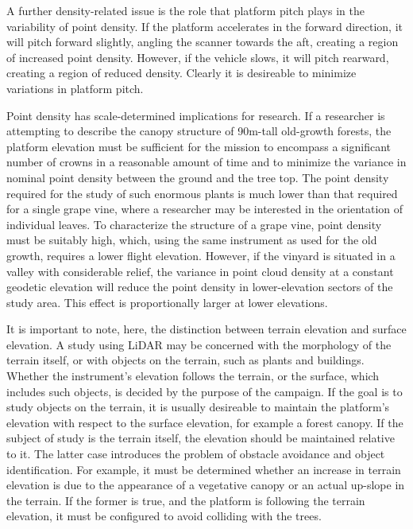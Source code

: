 \documentclass[10pt,a4paper]{report}
\begin{document}
A further density-related issue is the role that platform pitch plays in the variability of point density. If the platform accelerates in the forward direction, it will pitch forward slightly, angling the scanner towards the aft, creating a region of increased point density. However, if the vehicle slows, it will pitch rearward, creating a region of reduced density. Clearly it is desireable to minimize variations in platform pitch.

Point density has scale-determined implications for research. If a researcher is attempting to describe the canopy structure of 90m-tall old-growth forests, the platform elevation must be sufficient for the mission to encompass a significant number of crowns in a reasonable amount of time and to  minimize the variance in nominal point density between the ground and the tree top. The point density required for the study of such enormous plants is much lower than that required for a single grape vine, where a researcher may be interested in the orientation of individual leaves. To characterize the structure of a grape vine, point density must be suitably high, which, using the same instrument as used for the old growth, requires a lower flight elevation. However, if the vinyard is situated in a valley with considerable relief, the variance in point cloud density at a constant geodetic elevation will reduce the point density in lower-elevation sectors of the study area. This effect is proportionally larger at lower elevations.

It is important to note, here, the distinction between terrain elevation and surface elevation. A study using LiDAR may be concerned with the morphology of the terrain itself, or with objects on the terrain, such as plants and buildings. Whether the instrument's elevation follows the terrain, or the surface, which includes such objects, is decided by the purpose of the campaign. If the goal is to study objects on the terrain, it is usually desireable to maintain the platform's elevation with respect to the surface elevation, for example a forest canopy. If the subject of study is the terrain itself, the elevation should be maintained relative to it. The latter case introduces the problem of obstacle avoidance and object identification. For example, it must be determined whether an increase in terrain elevation is due to the appearance of a vegetative canopy or an actual up-slope in the terrain. If the former is true, and the platform is following the terrain elevation, it must be configured to avoid colliding with the trees.
\end{document}
